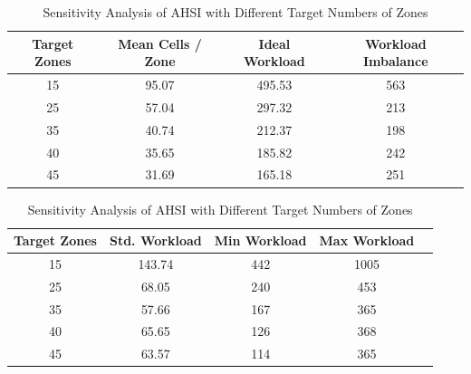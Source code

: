 \documentclass{article}
\begin{document}
\begin{table}[H]
\centering
\caption{Sensitivity Analysis of AHSI with Different Target Numbers of Zones}
\label{tab:ahsi_sensitivity}
\small

\begin{tabular}{cccc}
\toprule
\textbf{Target Zones} & \textbf{Mean Cells / Zone} & \textbf{Ideal Workload} & \textbf{Workload Imbalance} \\
\midrule
15 & 95.07 & 495.53 & 563 \\
25 & 57.04 & 297.32 & 213 \\
35 & 40.74 & 212.37 & 198 \\
40 & 35.65 & 185.82 & 242 \\
45 & 31.69 & 165.18 & 251 \\
\bottomrule
\end{tabular}

\vspace{1.2em}

\begin{tabular}{ccccc}
\toprule
\textbf{Target Zones} & \textbf{Std. Workload} & \textbf{Min Workload} & \textbf{Max Workload}  \\
\midrule
15 & 143.74 & 442 & 1005 \\
25 & 68.05  & 240 & 453  \\
35 & 57.66  & 167 & 365  \\
40 & 65.65  & 126 & 368  \\
45 & 63.57  & 114 & 365  \\
\bottomrule
\end{tabular}
\end{table}
\end{document}
